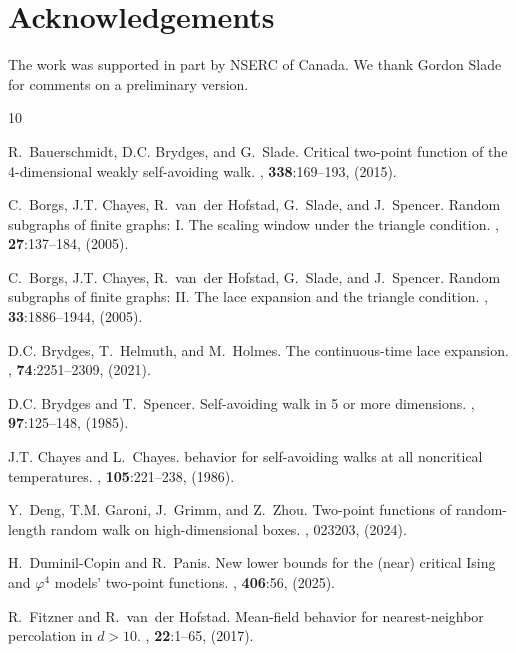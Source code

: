 \documentclass[11pt,hidelinks]{article}
\theoremstyle{plain}
\numberwithin{equation}{section}
\renewcommand{\(}{\left(}
\renewcommand{\)}{\right)}
\newcommand{\1}{\mathds{1}}
\begin{document}
\section*{Acknowledgements}
The work was supported in part by NSERC of Canada.
We thank Gordon Slade for comments on a preliminary version. 

{ \small
\begin{thebibliography}{10}

R.~Bauerschmidt, D.C. Brydges, and G.~Slade.
\newblock Critical two-point function of the 4-dimensional weakly self-avoiding
  walk.
, {\bf 338}:169--193, (2015).

C.~Borgs, J.T. Chayes, R.~van~der Hofstad, G.~Slade, and J.~Spencer.
\newblock Random subgraphs of finite graphs: {I}. {The} scaling window under
  the triangle condition.
, {\bf 27}:137--184, (2005).

C.~Borgs, J.T. Chayes, R.~van~der Hofstad, G.~Slade, and J.~Spencer.
\newblock Random subgraphs of finite graphs: {II}. {The} lace expansion and the
  triangle condition.
, {\bf 33}:1886--1944, (2005).

D.C. Brydges, T.~Helmuth, and M.~Holmes.
\newblock The continuous-time lace expansion.
, {\bf 74}:2251--2309, (2021).

D.C. Brydges and T.~Spencer.
\newblock Self-avoiding walk in 5 or more dimensions.
, {\bf 97}:125--148, (1985).

J.T. Chayes and L.~Chayes.
 behavior for self-avoiding walks at all
  noncritical temperatures.
, {\bf 105}:221--238, (1986).

Y.~Deng, T.M. Garoni, J.~Grimm, and Z.~Zhou.
\newblock Two-point functions of random-length random walk on high-dimensional
  boxes.
, 023203, (2024).

H.~Duminil-Copin and R.~Panis.
\newblock New lower bounds for the (near) critical {Ising} and $\varphi^4$
  models' two-point functions.
, {\bf 406}:56, (2025).

R.~Fitzner and R.~van~der Hofstad.
\newblock Mean-field behavior for nearest-neighbor percolation in $d>10$.
, {\bf 22}:1--65, (2017).


\end{thebibliography}}
\end{document}
